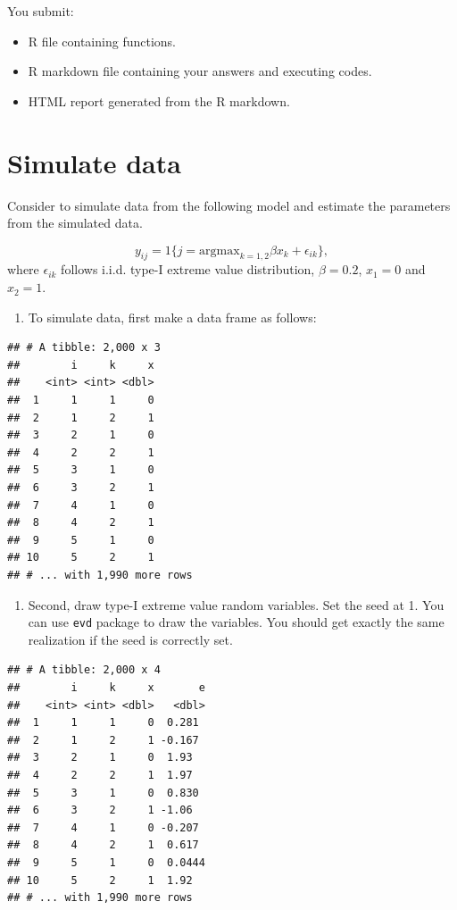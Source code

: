 \documentclass[]{book}
\providecommand{\tightlist}{%
  \setlength{\itemsep}{0pt}\setlength{\parskip}{0pt}}
\begin{document}
You submit:

\begin{itemize}
\tightlist
\item
  R file containing functions.
\item
  R markdown file containing your answers and executing codes.
\item
  HTML report generated from the R markdown.
\end{itemize}

\section{Simulate data}\label{simulate-data}

Consider to simulate data from the following model and estimate the
parameters from the simulated data.

\[
y_{ij} = 1\{j = \text{argmax}_{k = 1, 2} \beta x_k + \epsilon_{ik} \},
\] where \(\epsilon_{ik}\) follows i.i.d. type-I extreme value
distribution, \(\beta = 0.2\), \(x_1 = 0\) and \(x_2 = 1\).

\begin{enumerate}
\def\labelenumi{\arabic{enumi}.}
\tightlist
\item
  To simulate data, first make a data frame as follows:
\end{enumerate}

\begin{verbatim}
## # A tibble: 2,000 x 3
##        i     k     x
##    <int> <int> <dbl>
##  1     1     1     0
##  2     1     2     1
##  3     2     1     0
##  4     2     2     1
##  5     3     1     0
##  6     3     2     1
##  7     4     1     0
##  8     4     2     1
##  9     5     1     0
## 10     5     2     1
## # ... with 1,990 more rows
\end{verbatim}

\begin{enumerate}
\def\labelenumi{\arabic{enumi}.}
\setcounter{enumi}{1}
\tightlist
\item
  Second, draw type-I extreme value random variables. Set the seed at 1.
  You can use \texttt{evd} package to draw the variables. You should get
  exactly the same realization if the seed is correctly set.
\end{enumerate}

\begin{verbatim}
## # A tibble: 2,000 x 4
##        i     k     x       e
##    <int> <int> <dbl>   <dbl>
##  1     1     1     0  0.281 
##  2     1     2     1 -0.167 
##  3     2     1     0  1.93  
##  4     2     2     1  1.97  
##  5     3     1     0  0.830 
##  6     3     2     1 -1.06  
##  7     4     1     0 -0.207 
##  8     4     2     1  0.617 
##  9     5     1     0  0.0444
## 10     5     2     1  1.92  
## # ... with 1,990 more rows
\end{verbatim}
\end{document}
